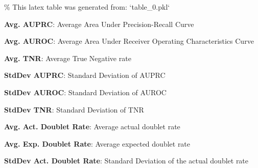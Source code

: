 \documentclass[11pt]{article}
\begin{document}
\begin{codeoutput}
\% This latex table was generated from: `table\_0.pkl`
\begin{table}[h]
\caption{Descriptive statistics of performance metrics stratified by condition}
\label{table:table\_0}
\begin{threeparttable}
\renewcommand{\TPTminimum}{\linewidth}
\begin{tablenotes}
\footnotesize
\item \textbf{Avg. AUPRC}: Average Area Under Precision-Recall Curve
\item \textbf{Avg. AUROC}: Average Area Under Receiver Operating Characteristics Curve
\item \textbf{Avg. TNR}: Average True Negative rate
\item \textbf{StdDev AUPRC}: Standard Deviation of AUPRC
\item \textbf{StdDev AUROC}: Standard Deviation of AUROC
\item \textbf{StdDev TNR}: Standard Deviation of TNR
\item \textbf{Avg. Act. Doublet Rate}: Average actual doublet rate
\item \textbf{Avg. Exp. Doublet Rate}: Average expected doublet rate
\item \textbf{StdDev Act. Doublet Rate}: Standard Deviation of the actual doublet rate

\end{tablenotes}
\end{threeparttable}
\end{table}
\end{codeoutput}
\end{document}
